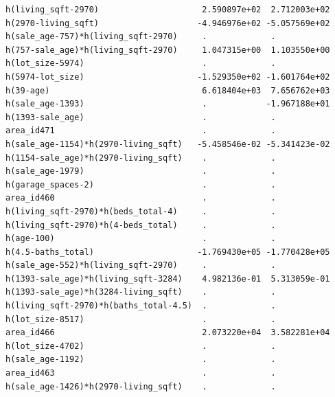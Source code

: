 \documentclass[
]{article}
\begin{document}
\begin{verbatim}
h(living_sqft-2970)                     2.590897e+02  2.712003e+02
h(2970-living_sqft)                    -4.946976e+02 -5.057569e+02
h(sale_age-757)*h(living_sqft-2970)     .             .           
h(757-sale_age)*h(living_sqft-2970)     1.047315e+00  1.103550e+00
h(lot_size-5974)                        .             .           
h(5974-lot_size)                       -1.529350e+02 -1.601764e+02
h(39-age)                               6.618404e+03  7.656762e+03
h(sale_age-1393)                        .            -1.967188e+01
h(1393-sale_age)                        .             .           
area_id471                              .             .           
h(sale_age-1154)*h(2970-living_sqft)   -5.458546e-02 -5.341423e-02
h(1154-sale_age)*h(2970-living_sqft)    .             .           
h(sale_age-1979)                        .             .           
h(garage_spaces-2)                      .             .           
area_id460                              .             .           
h(living_sqft-2970)*h(beds_total-4)     .             .           
h(living_sqft-2970)*h(4-beds_total)     .             .           
h(age-100)                              .             .           
h(4.5-baths_total)                     -1.769430e+05 -1.770428e+05
h(sale_age-552)*h(living_sqft-2970)     .             .           
h(1393-sale_age)*h(living_sqft-3284)    4.982136e-01  5.313059e-01
h(1393-sale_age)*h(3284-living_sqft)    .             .           
h(living_sqft-2970)*h(baths_total-4.5)  .             .           
h(lot_size-8517)                        .             .           
area_id466                              2.073220e+04  3.582281e+04
h(lot_size-4702)                        .             .           
h(sale_age-1192)                        .             .           
area_id463                              .             .           
h(sale_age-1426)*h(2970-living_sqft)    .             .           
                                                                  

\end{verbatim}
\end{document}
